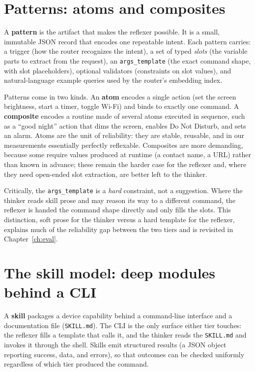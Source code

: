 \section{Patterns: atoms and composites}
\label{sec:patterns}

A \textbf{pattern} is the artifact that makes the reflexer possible. It is a
small, immutable JSON record that encodes one repeatable intent. Each pattern
carries: a trigger (how the router recognizes the intent), a set of typed
\emph{slots} (the variable parts to extract from the request), an
\texttt{args\_template} (the exact command shape, with slot placeholders),
optional validators (constraints on slot values), and natural-language example
queries used by the router's embedding index.

Patterns come in two kinds. An \textbf{atom} encodes a single action (set the
screen brightness, start a timer, toggle Wi-Fi) and binds to exactly one
command. A \textbf{composite} encodes a routine made of several atoms executed in
sequence, such as a ``good night'' action that dims the screen, enables Do Not
Disturb, and sets an alarm. Atoms are the unit of reliability: they are stable,
reusable, and in our measurements essentially perfectly reflexable. Composites
are more demanding, because some require values produced at runtime (a contact
name, a URL) rather than known in advance; these remain the harder case for the
reflexer and, where they need open-ended slot extraction, are better left to the
thinker.

Critically, the \texttt{args\_template} is a \emph{hard} constraint, not a
suggestion. Where the thinker reads skill prose and may reason its way to a
different command, the reflexer is handed the command shape directly and only
fills the slots. This distinction, soft prose for the thinker versus a hard
template for the reflexer, explains much of the reliability gap between the two
tiers and is revisited in Chapter~\ref{ch:eval}.

\section{The skill model: deep modules behind a CLI}
\label{sec:skills}

A \textbf{skill} packages a device capability behind a command-line interface
and a documentation file (\texttt{SKILL.md}). The CLI is the only surface either
tier touches: the reflexer fills a template that calls it, and the thinker reads
the \texttt{SKILL.md} and invokes it through the shell. Skills emit structured
results (a JSON object reporting success, data, and errors), so that outcomes can
be checked uniformly regardless of which tier produced the command.

